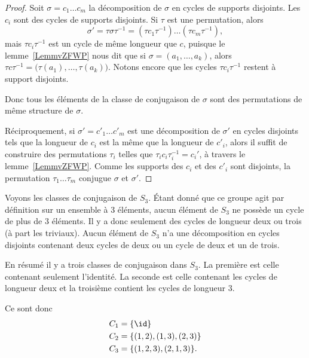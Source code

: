 \begin{proof}
    Soit \( \sigma=c_1\ldots c_m\) la décomposition de \( \sigma\) en cycles de supports disjoints. Les \( c_i\) sont des cycles de supports disjoints. Si \( \tau\) est une permutation, alors
    \begin{equation}
        \sigma'=\tau\sigma\tau^{-1}=(\tau c_1\tau^{-1})\ldots (\tau c_m\tau^{-1}),
    \end{equation}
    mais \( \tau c_i\tau^{-1}\) est un cycle de même longueur que \( c\), puisque le lemme~\ref{LemmvZFWP} nous dit que si \( \sigma=(a_1,\ldots, a_k)\), alors \( \tau c\tau^{-1}=\big( \tau(a_1),\ldots, \tau(a_k) \big)\). Notons encore que les cycles \( \tau c_i\tau^{-1}\) restent à support disjoints.

    Donc tous les éléments de la classe de conjugaison de \( \sigma\) sont des permutations de même structure de \( \sigma\).

    Réciproquement, si \( \sigma'=c'_1\ldots c'_m\) est une décomposition de \( \sigma'\) en cycles disjoints tels que la longueur de \( c_i\) est la même que la longueur de \( c'_i\), alors il suffit de construire des permutations \( \tau_i\) telles que \( \tau_i c_i\tau_i^{-1}=c_i'\), à travers le lemme~\ref{LemmvZFWP}. Comme les supports des $c_i$ et des $c'_i$ sont disjoints, la permutation \( \tau_1\ldots \tau_m\) conjugue \( \sigma\) et \( \sigma'\).
\end{proof}

\begin{example}     \label{EXooQAXRooBsPURs}
    Voyons les classes de conjugaison de \( S_3\). Étant donné que ce groupe agit par définition sur un ensemble à \( 3\) éléments, aucun élément de \( S_3\) ne possède un cycle de plus de \( 3\) éléments. Il y a donc seulement des cycles de longueur deux ou trois (à part les triviaux). Aucun élément de \( S_3\) n'a une décomposition en cycles disjoints contenant deux cycles de deux ou un cycle de deux et un de trois.

    En résumé il y a trois classes de conjugaison dans \( S_3\). La première est celle contenant seulement l'identité. La seconde est celle contenant les cycles de longueur deux et la troisième contient les cycles de longueur \( 3\).

    Ce sont donc
    \begin{subequations}
        \begin{align}
            C_1&=\{ \id \}\\
            C_2&=\{ (1,2),(1,3),(2,3) \}\\
            C_3&=\{ (1,2,3),(2,1,3) \}.
        \end{align}
    \end{subequations}
\end{example}

